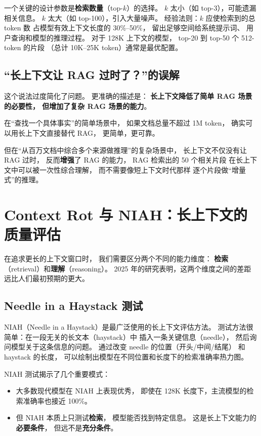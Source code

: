 一个关键的设计参数是\textbf{检索数量}（top-$k$）的选择。
$k$ 太小（如 top-3），可能遗漏相关信息。
$k$ 太大（如 top-100），引入大量噪声。
经验法则：$k$ 应使检索到的总 token 数
占模型有效上下文长度的 30\%--50\%，
留出足够空间给系统提示词、
用户查询和模型的推理过程。
对于 128K 上下文的模型，
top-20 到 top-50 个 512-token 的片段
（总计 10K--25K token）通常是最优配置。

\subsection{“长上下文让 RAG 过时了？”的误解}

这个说法过度简化了问题。
更准确的描述是：
\textbf{长上下文降低了简单 RAG 场景的必要性，
但增加了复杂 RAG 场景的能力}。

在“查找一个具体事实”的简单场景中，
如果文档总量不超过 1M token，
确实可以用长上下文直接替代 RAG，
更简单，更可靠。

但在“从百万文档中综合多个来源做推理”的复杂场景中，
长上下文不仅没有让 RAG 过时，
反而\textbf{增强}了 RAG 的能力，
RAG 检索出的 50 个相关片段
在长上下文中可以被一次性综合理解，
而不需要像短上下文时代那样
逐个片段做“增量式”的推理。

\section{Context Rot 与 NIAH：长上下文的质量评估}

在追求更长的上下文窗口时，
我们需要区分两个不同的能力维度：
\textbf{检索}（retrieval）和\textbf{理解}（reasoning）。
2025 年的研究表明，这两个维度之间的差距
远比人们最初预期的更大。

\subsection{Needle in a Haystack 测试}

NIAH（Needle in a Haystack）是最广泛使用的长上下文评估方法。
测试方法很简单：在一段无关的长文本（haystack）中
插入一条关键信息（needle），
然后询问模型关于这条信息的问题。
通过改变 needle 的位置（开头/中间/结尾）
和 haystack 的长度，
可以绘制出模型在不同位置和长度下的检索准确率热力图。

NIAH 测试揭示了几个重要模式：
\begin{itemize}[noitemsep]
  \item 大多数现代模型在 NIAH 上表现优秀，
        即使在 128K 长度下，主流模型的检索准确率也接近 100\%。
  \item 但 NIAH 本质上只测试\textbf{检索}，
        模型能否找到特定信息。
        这是长上下文能力的\textbf{必要条件}，
        但远不是\textbf{充分条件}。
\end{itemize}

